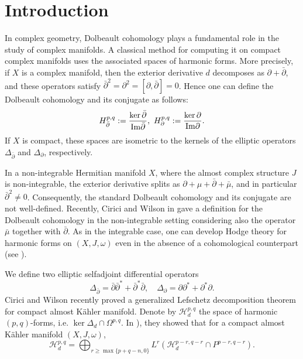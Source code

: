 \documentclass[12pt, twoside]{article}
\theoremstyle{definition}
\numberwithin{equation}{section}
\def \De {\Delta}
\def\w {\omega}
\def\Om{\Omega}
\def\pa{\partial}
\begin{document}
	\section{Introduction}
	
	
	In complex geometry, Dolbeault cohomology plays a fundamental role in the study of complex manifolds.
	 A classical method for computing it on compact complex manifolds uses the associated spaces of harmonic forms.
	 More precisely, if $X$ is a complex manifold, then the exterior derivative $d$ decomposes as $\pa+\bar{\pa}$, and these operators satisfy $\bar{\pa}^{2}=\pa^{2}=[\pa,\bar{\pa}]=0$. Hence one can define the Dolbeault cohomology and its conjugate as follows:
	$$H^{p,q}_{\bar{\pa}}:=\frac{\ker\bar{\pa}}{{\rm{Im}}\bar{\pa}},\ H^{p,q}_{\pa}:=\frac{\ker\pa}{{\rm{Im}}\pa}.$$
	If $X$ is compact, these spaces are isometric to the kernels of the elliptic operators $\De_{\bar{\pa}}$ and $\De_{\pa}$, respectively.
	
In a non-integrable Hermitian manifold  $X$, where the almost complex structure $J$ is non-integrable, the exterior derivative splits as $\pa+\mu+\bar{\pa}+\bar{\mu}$, and in particular $\bar{\pa}^{2}\neq 0$. Consequently, the standard Dolbeault cohomology and its conjugate are not well-defined. Recently, Cirici and Wilson in \cite{CW21} gave a definition for the Dolbeault cohomology in the non-integrable setting considering also the operator $\bar{\mu}$ together with $\bar{\pa}$. As in the integrable case, one can develop Hodge theory for harmonic forms on $(X,J,\w)$ even in the absence of a cohomological counterpart  (see \cite{CTT,PT21,PT22,TT,TT21}).
	
We define two elliptic selfadjoint differential operators
$$\De_{\bar{\pa}}=\bar{\pa}\bar{\pa}^{\ast}+\bar{\pa}^{\ast}\bar{\pa},\quad \De_{\pa}=\pa\pa^{\ast}+\pa^{\ast}\pa.$$
Cirici and Wilson \cite{CW20} recently proved a generalized Lefschetz decomposition theorem for compact almost K\"{a}hler manifold. 
Denote by $\mathcal{H}^{p,q}_{d}$ the space of harmonic $(p,q)$-forms, i.e. $\ker\De_{d}\cap\Om^{p,q}$. In \cite[Corollary 5.4]{CW20}), they showed that for a compact almost K\"{a}hler manifold $(X,J,\w)$, 
$$\mathcal{H}^{p,q}_{d}=\bigoplus_{r\geq\max\{p+q-n,0\}}L^{r}(\mathcal{H}^{p-r,q-r}_{d}\cap P^{p-r,q-r}).$$
	
\end{document}
